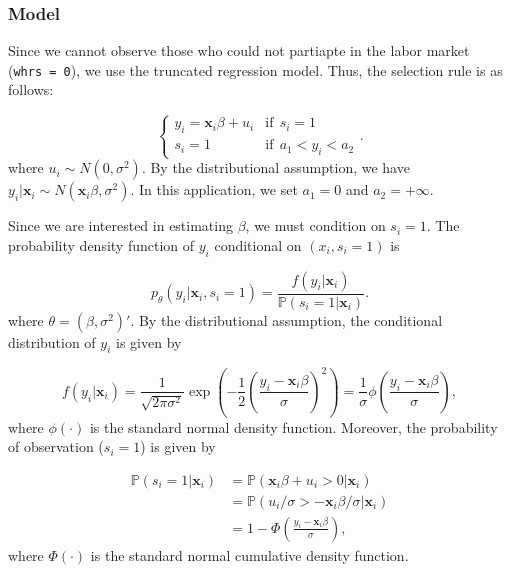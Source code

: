 \documentclass[
  12pt,
]{article}
\begin{document}
\hypertarget{model-2}{%
\subsubsection{Model}\label{model-2}}

Since we cannot observe those who could not partiapte in the labor market (\texttt{whrs\ =\ 0}),
we use the truncated regression model.
Thus, the selection rule is as follows:

\begin{equation*}
  \begin{cases}
    y_i = \mathbf{x}_i \beta + u_i &\text{if}\:\: s_i = 1  \\
    s_i = 1 &\text{if}\:\: a_1 < y_i < a_2
  \end{cases}.
\end{equation*}
where \(u_i \sim N(0, \sigma^2)\).
By the distributional assumption, we have \(y_i | \mathbf{x}_i \sim N(\mathbf{x}_i \beta, \sigma^2)\).
In this application, we set \(a_1 = 0\) and \(a_2 = +\infty\).

Since we are interested in estimating \(\beta\), we must condition on \(s_i = 1\).
The probability density function of \(y_i\) conditional on \((x_i, s_i = 1)\) is

\begin{equation*}
  p_{\theta}(y_i | \mathbf{x}_i, s_i = 1) = \frac{f(y_i | \mathbf{x}_i)}{\mathbb{P}(s_i = 1 | \mathbf{x}_i)}.
\end{equation*}
where \(\theta = (\beta, \sigma^2)'\).
By the distributional assumption, the conditional distribution of \(y_i\) is given by

\begin{equation*}
  f(y_i | \mathbf{x}_i) 
  = \frac{1}{\sqrt{2\pi\sigma^2}} \exp \left( -\frac{1}{2} \left( \frac{y_i - \mathbf{x}_i \beta}{\sigma} \right)^2 \right)
  = \frac{1}{\sigma} \phi \left( \frac{y_i - \mathbf{x}_i \beta}{\sigma} \right),
\end{equation*}
where \(\phi(\cdot)\) is the standard normal density function.
Moreover, the probability of observation (\(s_i = 1\)) is given by

\begin{align*}
  \mathbb{P}(s_i = 1 | \mathbf{x}_i) 
  &= \mathbb{P}(\mathbf{x}_i \beta + u_i > 0| \mathbf{x}_i)  \\
  &= \mathbb{P}(u_i/\sigma > -\mathbf{x}_i \beta/\sigma| \mathbf{x}_i)  \\
  &= 1 - \Phi \left( \frac{y_i - \mathbf{x}_i \beta}{\sigma} \right),
\end{align*}
where \(\Phi(\cdot)\) is the standard normal cumulative density function.
\end{document}
